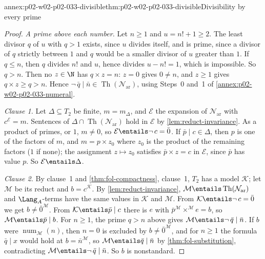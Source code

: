 \begin{annexitem}{annex:p02-w02-p02-033-divisible}{thm:p02-w02-p02-033-divisible}{Divisibility by every prime}
\begin{proof}
\emph{A prime above each number.}  Let \(n\geq1\) and \(u=n!+1\geq2\).  The
least divisor \(q\) of \(u\) with \(q>1\) exists, since \(u\) divides itself,
and is prime, since a divisor of \(q\) strictly between \(1\) and \(q\) would
be a smaller divisor of \(u\) greater than \(1\).  If \(q\leq n\), then
\(q\) divides \(n!\) and \(u\), hence divides \(u-n!=1\), which is
impossible.  So \(q>n\).  Then no \(z\in\N\) has \(q\times z=n\): \(z=0\)
gives \(0\ne n\), and \(z\geq1\) gives \(q\times z\geq q>n\).  Hence
\(\neg\,\bar q\mid\bar n\in\operatorname{Th}(\mathcal N_{\mathrm{ar}})\),
using Steps~0 and~1 of \cref{annex:p02-w02-p02-033-numeral}.

\emph{Clause 1.}  Let \(\Delta\subseteq T_2\) be finite, \(m=m_\Delta\), and
\(\mathcal E\) the expansion of \(\mathcal N_{\mathrm{ar}}\) with
\(c^{\mathcal E}=m\).  Sentences of
\(\Delta\cap\operatorname{Th}(\mathcal N_{\mathrm{ar}})\) hold in
\(\mathcal E\) by \cref{lem:reduct-invariance}.  As a product of primes, or
\(1\), \(m\ne0\), so \(\mathcal E\entails\neg\,c=\bar 0\).  If
\(\bar p\mid c\in\Delta\), then \(p\) is one of the factors of \(m\), and
\(m=p\times z_0\) where \(z_0\) is the product of the remaining factors
(\(1\) if none); the assignment \(z\mapsto z_0\) satisfies
\(\bar p\times z=c\) in \(\mathcal E\), since \(\bar p\) has value \(p\).  So
\(\mathcal E\entails\Delta\).

\emph{Clause 2.}  By clause~1 and \cref{thm:fol-compactness}, clause~1,
\(T_2\) has a model \(\mathcal K\); let \(\mathcal M\) be its reduct and
\(b=c^{\mathcal K}\).  By \cref{lem:reduct-invariance},
\(\mathcal M\entails\operatorname{Th}(\mathcal N_{\mathrm{ar}})\) and
\(\Lang_A\)-terms have the same values in \(\mathcal K\) and \(\mathcal M\).
From \(\mathcal K\entails\neg\,c=\bar 0\) we get
\(b\ne\bar 0^{\mathcal M}\).  From \(\mathcal K\entails\bar p\mid c\) there is
\(e\) with \(\bar p^{\mathcal M}\times^{\mathcal M}e=b\), so
\(\mathcal M\entails\bar p\mid b\).  For \(n\geq1\), the prime \(q>n\) above
gives \(\mathcal M\entails\neg\,\bar q\mid\bar n\).  If \(b\) were
\(\operatorname{num}_{\mathcal M}(n)\), then \(n=0\) is excluded by
\(b\ne\bar 0^{\mathcal M}\), and for \(n\geq1\) the formula
\(\bar q\mid x\) would hold at \(b=\bar n^{\mathcal M}\), so
\(\mathcal M\entails\bar q\mid\bar n\) by \cref{thm:fol-substitution},
contradicting \(\mathcal M\entails\neg\,\bar q\mid\bar n\).  So \(b\) is
nonstandard.
\end{proof}
\end{annexitem}

